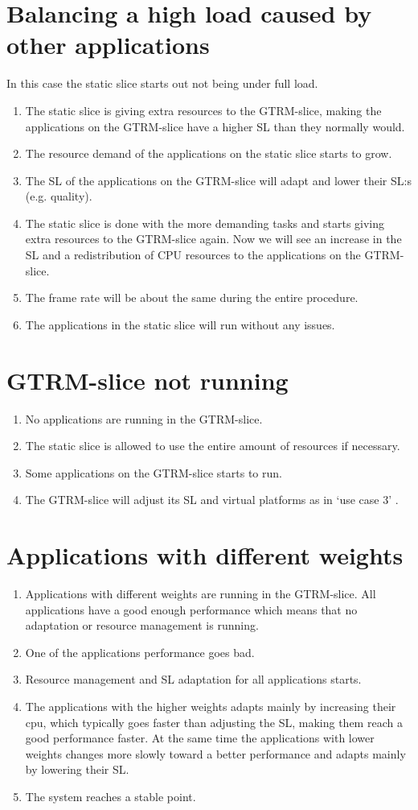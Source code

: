 \documentclass{LTHthesis}
\begin{document}
\section{Balancing a high load caused by other applications}
In this case the static slice starts out not being under full load.
\begin{enumerate}
\item The static slice is giving extra resources to the GTRM-slice, making the applications on the GTRM-slice have a higher SL than they normally would.
\item The resource demand of the applications on the static slice starts to grow. 
\item The SL of the applications on the GTRM-slice will adapt and lower their SL:s (e.g. quality).
\item The static slice is done with the more demanding tasks and starts giving extra resources to the GTRM-slice again. Now we will see an increase in the SL and a redistribution of CPU resources to the applications on the GTRM-slice.
\item The frame rate will be about the same during the entire procedure.
\item The applications in the static slice will run without any issues.
\end{enumerate}
\section{GTRM-slice not running}
\begin{enumerate}
\item No applications are running in the GTRM-slice.
\item The static slice is allowed to use the entire amount of resources if necessary.
\item Some applications on the GTRM-slice starts to run.
\item The GTRM-slice will adjust its SL and virtual platforms as in ‘use case 3’ .
\end{enumerate}

\section{Applications with different weights}
\begin{enumerate}
\item Applications with different weights are running in the GTRM-slice. All applications have a good enough performance which means that no adaptation or resource management is running. 
\item One of the applications performance goes bad.
\item Resource management and SL adaptation for all applications starts.
\item The applications with the higher weights adapts mainly by increasing their cpu, which typically goes faster than adjusting the SL, making them reach a good performance faster. At the same time the applications with lower weights changes more slowly toward a better performance and adapts mainly by lowering their SL.
\item The system reaches a stable point.
\end{enumerate}
\end{document}
